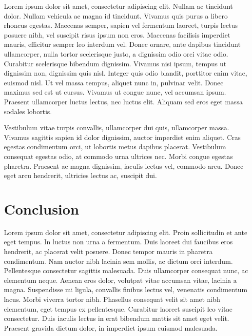 \documentclass[a4paper,15pt]{article}
\begin{document}
Lorem ipsum dolor sit amet, consectetur adipiscing elit. Nullam ac tincidunt dolor. Nullam vehicula ac magna id tincidunt. Vivamus quis purus a libero rhoncus egestas. Maecenas semper, sapien vel fermentum laoreet, turpis lectus posuere nibh, vel suscipit risus ipsum non eros. Maecenas facilisis imperdiet mauris, efficitur semper leo interdum vel. Donec ornare, ante dapibus tincidunt ullamcorper, nulla tortor scelerisque justo, a dignissim odio orci vitae odio. Curabitur scelerisque bibendum dignissim. Vivamus nisi ipsum, tempus ut dignissim non, dignissim quis nisl. Integer quis odio blandit, porttitor enim vitae, euismod nisl. Ut vel massa tempus, aliquet nunc in, pulvinar velit. Donec maximus sed est ut cursus. Vivamus ut congue nunc, vel accumsan ipsum. Praesent ullamcorper luctus lectus, nec luctus elit. Aliquam sed eros eget massa sodales lobortis.

Vestibulum vitae turpis convallis, ullamcorper dui quis, ullamcorper massa. Vivamus sagittis sapien id dolor dignissim, auctor imperdiet enim aliquet. Cras egestas condimentum orci, ut lobortis metus dapibus placerat. Vestibulum consequat egestas odio, at commodo urna ultrices nec. Morbi congue egestas pharetra. Praesent ac magna dignissim, iaculis lectus vel, commodo arcu. Donec eget arcu hendrerit, ultricies lectus ac, suscipit dui.

\section{Conclusion}

Lorem ipsum dolor sit amet, consectetur adipiscing elit. Proin sollicitudin et ante eget tempus. In luctus non urna a fermentum. Duis laoreet dui faucibus eros hendrerit, ac placerat velit posuere. Donec tempor mauris in pharetra condimentum. Nam auctor nibh lacinia sem mollis, ac dictum orci interdum. Pellentesque consectetur sagittis malesuada. Duis ullamcorper consequat nunc, ac elementum neque. Aenean eros dolor, volutpat vitae accumsan vitae, lacinia a magna. Suspendisse mi ligula, convallis finibus lectus vel, venenatis condimentum lacus. Morbi viverra tortor nibh. Phasellus consequat velit sit amet nibh elementum, eget tempus ex pellentesque. Curabitur laoreet suscipit leo vitae consectetur. Duis iaculis lectus in erat bibendum mattis sit amet eget velit. Praesent gravida dictum dolor, in imperdiet ipsum euismod malesuada.




\newpage
\end{document}

